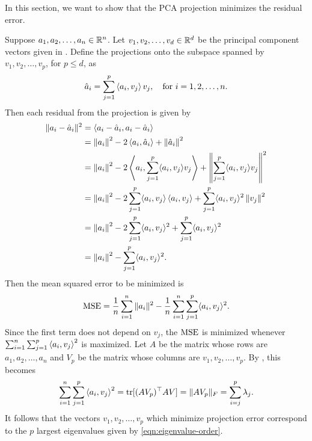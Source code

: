 In this section, we want to show that the PCA projection minimizes the residual error.

Suppose \(a_1, a_2, \dots, a_n \in \mathbb{R}^n\).
Let \(v_1, v_2, \dots, v_d \in \mathbb{R}^d\) be the principal component vectors given in .
Define the projections onto the subspace spanned by \(v_1, v_2, \dots, v_p\), for \(p \leq d\), as
\begin{equation}
    \hat{a}_i = \sum_{j=1}^{p} \left\langle a_i, v_j \right\rangle v_j,
    \quad \text{for \(i = 1,2,\dots, n\)}.
\end{equation}
Then each residual from the projection is given by
\begin{align}
    \label{eqn:projection-residuals}
    \|a_i - \hat{a}_i\|^2
    &= \left\langle a_i - \hat{a}_i, a_i - \hat{a}_i\right\rangle
    \\
    &= \left\| a_i \right\|^2
    - 2\left\langle a_i, \hat{a}_i \right\rangle
    + \left\| \hat{a}_i \right\|^2
    \notag \\
    &= \left\| a_i \right\|^2
    - 2\left\langle a_i, \sum_{j=1}^{p} \langle a_i, v_j \rangle v_j \right\rangle
    + \left\| \sum_{j=1}^{p} \langle a_i, v_j \rangle v_j \right\|^2
    \notag \\
    &= \left\| a_i \right\|^2
    - 2\sum_{j=1}^{p} \langle a_i, v_j \rangle \left\langle a_i,  v_j \right\rangle
    + \sum_{j=1}^{p} \langle a_i, v_j \rangle^2 \left\|  v_j \right\|^2 
    \notag \\
    &= \left\| a_i \right\|^2
    - 2\sum_{j=1}^{p} \langle a_i, v_j \rangle^2
    + \sum_{j=1}^{p} \langle a_i, v_j \rangle^2
    \notag \\
    &= \left\| a_i \right\|^2
    - \sum_{j=1}^{p} \langle a_i, v_j \rangle^2.
    \notag
\end{align}
Then the mean squared error to be minimized is
\begin{equation}
    \mathrm{MSE} =
    \frac{1}{n} \sum_{i=1}^{n} \|a_i\|^2 - \frac{1}{n} \sum_{i=1}^{n} \sum_{j=1}^{p} \langle a_i, v_j \rangle^2.
\end{equation}
Since the first term does not depend on \(v_j\), the \(\mathrm{MSE}\) is minimized whenever
    \(\sum_{i=1}^{n} \sum_{j=1}^{p} \left\langle a_i, v_j \right\rangle^2\)
is maximized.
Let \(A\) be the matrix whose rows are \(a_1, a_2, \dots, a_n\) and \(V_p\) be the matrix whose columns are \(v_1, v_2, \dots, v_p\).
By , this becomes
\begin{equation}
    \sum_{i=1}^{n} \sum_{j=1}^{p} \left\langle a_i, v_j \right\rangle^2
    = \operatorname{tr}[(AV_p)^\top AV]
    = \|AV_p\|_F
    = \sum_{i=j}^{p} \lambda_j.
\end{equation}
It follows that the vectors \(v_1, v_2, \dots, v_p\) which minimize projection error correspond to the \(p\) largest eigenvalues given by \cref{eqn:eigenvalue-order}.